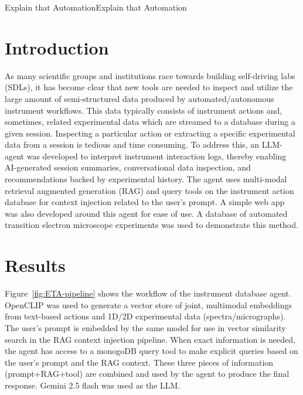 \begin{teamsubmission}{Explain that Automation}{Explain that Automation}

\section*{Introduction}
As many scientific groups and institutions race towards building self-driving labs (SDLs), it has become clear that new tools are needed to inspect and utilize the large amount of semi-structured data produced by automated/autonomous instrument workflows. This data typically consists of instrument actions and, sometimes, related experimental data which are streamed to a database during a given session. Inspecting a  particular action or extracting a specific experimental data from a session is tedious and time consuming. To address this, an LLM-agent was developed to interpret instrument interaction logs, thereby enabling AI-generated session summaries, conversational data inspection, and recommendations backed by experimental history. The agent uses multi-modal retrieval augmented generation (RAG) and query tools on the instrument action database for context injection related to the user's prompt. A simple web app was also developed around this agent for ease of use. A database of automated transition electron microscope experiments was used to demonstrate this method.  

\section*{Results}
Figure~\ref{fig:ETA-pipeline} shows the workflow of the instrument database agent. OpenCLIP was used to generate a vector store of joint, multimodal embeddings from text-based actions and 1D/2D experimental data (spectra/micrographs). The user's prompt is embedded by the same model for use in vector similarity search in the RAG context injection pipeline. When exact information is needed, the agent has access to a monogoDB query tool to make explicit queries based on the user's prompt and the RAG context. These three pieces of information (prompt+RAG+tool) are combined and used by the agent to produce the final response. Gemini 2.5 flash was used as the LLM.


\end{teamsubmission}
